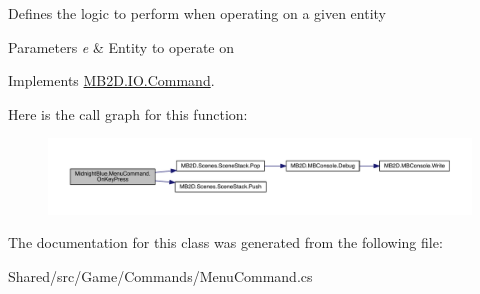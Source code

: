 Defines the logic to perform when operating on a given entity 


\begin{DoxyParams}{Parameters}
{\em e} & Entity to operate on\\
\hline
\end{DoxyParams}


Implements \hyperlink{class_m_b2_d_1_1_i_o_1_1_command_ae927e36c0e285848325cc68eddb5fd72}{M\+B2\+D.\+I\+O.\+Command}.

Here is the call graph for this function\+:
\nopagebreak
\begin{figure}[H]
\begin{center}
\leavevmode
\includegraphics[width=350pt]{class_midnight_blue_1_1_menu_command_a2101f922aa12bd7fed4eff3eb714a9d4_cgraph}
\end{center}
\end{figure}


The documentation for this class was generated from the following file\+:\begin{DoxyCompactItemize}
\item 
Shared/src/\+Game/\+Commands/Menu\+Command.\+cs\end{DoxyCompactItemize}
